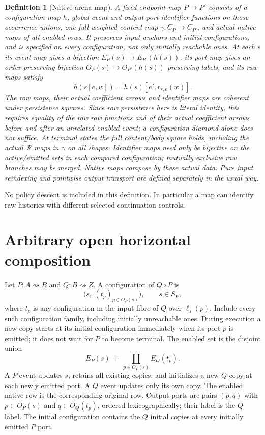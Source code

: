 \documentclass[11pt]{article}
\newtheorem{definition}{Definition}\newtheorem{theorem}[definition]{Theorem}\newtheorem{proposition}[definition]{Proposition}
\begin{document}
\begin{definition}[Native arena map]
A fixed-endpoint map $P\to P'$ consists of a configuration map $h$, global event and output-port identifier functions on those occurrence unions, one full weighted-content map $\gamma:C_P\to C_{P'}$, and actual native maps of all enabled rows. It preserves input anchors and initial configurations, and is specified on every configuration, not only initially reachable ones. At each $s$ its event map gives a bijection $E_P(s)\to E_{P'}(h(s))$, its port map gives an order-preserving bijection $O_P(s)\to O_{P'}(h(s))$ preserving labels, and its raw maps satisfy
\[
 h(s[e,w])=h(s)[e',r_{s,e}(w)].\tag{M}
\]
The row maps, their actual coefficient arrows and identifier maps are coherent under persistence squares. Since row persistence here is literal identity, this requires equality of the raw row functions and of their actual coefficient arrows before and after an unrelated enabled event; a configuration diamond alone does not suffice. At terminal states the full content/body square holds, including the actual $\mathcal R$ maps in $\gamma$ on all shapes. Identifier maps need only be bijective on the active/emitted sets in each compared configuration; mutually exclusive raw branches may be merged. Native maps compose by these actual data. Pure input reindexing and pointwise output transport are defined separately in the usual way.
\end{definition}
No policy descent is included in this definition. In particular a map can identify raw histories with different selected continuation controls.

\section{Arbitrary open horizontal composition}
Let $P:A\rightsquigarrow B$ and $Q:B\rightsquigarrow Z$. A configuration of $Q\circ P$ is
\[
 \bigl(s,\ (t_p)_{p\in O_P(s)}\bigr),\qquad s\in S_P,
\]
where $t_p$ is any configuration in the input fibre of $Q$ over $\ell_s(p)$. Include every such configuration family, including initially unreachable ones. During execution a new copy starts at its initial configuration immediately when its port $p$ is emitted; it does not wait for $P$ to become terminal. The enabled set is the disjoint union
\[
 E_P(s)\ +\ \coprod_{p\in O_P(s)}E_Q(t_p).
\]
A $P$ event updates $s$, retains all existing copies, and initializes a new $Q$ copy at each newly emitted port. A $Q$ event updates only its own copy. The enabled native row is the corresponding original row. Output ports are pairs $(p,q)$ with $p\in O_P(s)$ and $q\in O_Q(t_p)$, ordered lexicographically; their label is the $Q$ label. The initial configuration contains the $Q$ initial copies at every initially emitted $P$ port.
\end{document}
